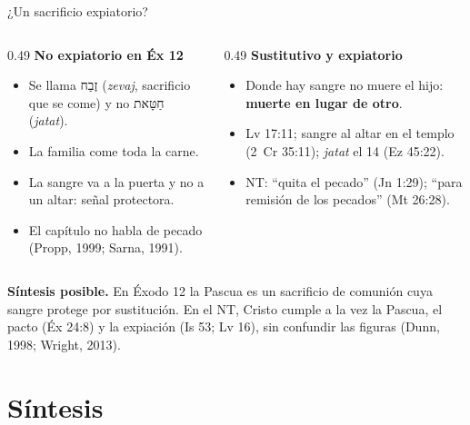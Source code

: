 \documentclass[hyperref={bookmarks=false},aspectratio=169]{beamer}
\newcommand{\heb}[1]{\mbox{\foreignlanguage{hebrew}{#1}}}
\newcommand{\destacar}[1]{\textbf{\textcolor{tierraroja}{#1}}}
\begin{document}
\begin{frame}{¿Un sacrificio expiatorio?}
\begin{columns}[t,onlytextwidth]
\begin{column}{0.49\textwidth}\scriptsize\RaggedRight
\textbf{\small\textcolor{tierraroja}{No expiatorio en Éx 12}}
\begin{itemize}\scriptsize
\item Se llama \heb{זֶבַח} (\emph{zevaj}, sacrificio que se come) y no \heb{חַטָּאת} (\emph{jatat}).
\item La familia come toda la carne.
\item La sangre va a la puerta y no a un altar: señal protectora.
\item El capítulo no habla de pecado (Propp, 1999; Sarna, 1991).
\end{itemize}
\end{column}
\begin{column}{0.49\textwidth}\scriptsize\RaggedRight
\textbf{\small\textcolor{tierraroja}{Sustitutivo y expiatorio}}
\begin{itemize}\scriptsize
\item Donde hay sangre no muere el hijo: \destacar{muerte en lugar de otro}.
\item Lv 17:11; sangre al altar en el templo (2~Cr 35:11); \emph{jatat} el 14 (Ez 45:22).
\item NT: ``quita el pecado'' (Jn 1:29); ``para remisión de los pecados'' (Mt 26:28).
\end{itemize}
\end{column}
\end{columns}
\medskip
\begin{tcolorbox}[colback=papiro,colframe=tierraroja,boxrule=0.8pt,arc=2pt,fontupper=\scriptsize]
\textbf{Síntesis posible.} En Éxodo 12 la Pascua es un sacrificio de comunión cuya sangre protege por sustitución. En el NT, Cristo cumple a la vez la Pascua, el pacto (Éx 24:8) y la expiación (Is 53; Lv 16), sin confundir las figuras (Dunn, 1998; Wright, 2013).
\end{tcolorbox}
\end{frame}

\section{Síntesis}
\end{document}
